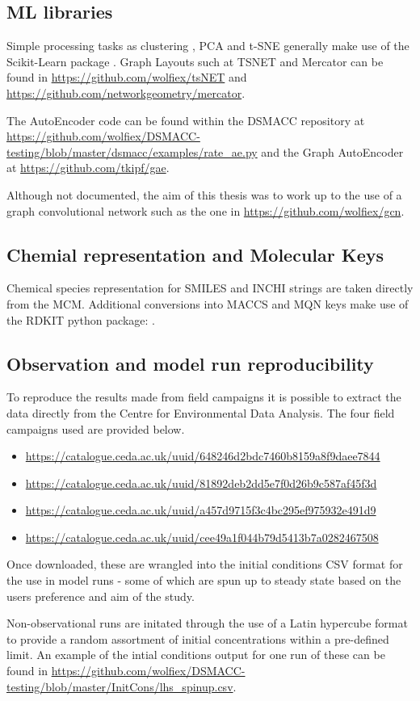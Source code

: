 \subsection*{ML libraries}
Simple processing tasks as clustering , PCA and t-SNE generally make use of the Scikit-Learn package \citep{sklearn}.
Graph Layouts such at TSNET and Mercator can be found in \url{https://github.com/wolfiex/tsNET} and \url{https://github.com/networkgeometry/mercator}.

The AutoEncoder  code can be found within the DSMACC repository at \url{https://github.com/wolfiex/DSMACC-testing/blob/master/dsmacc/examples/rate_ae.py} and the Graph AutoEncoder at \url{https://github.com/tkipf/gae}.


Although not documented, the aim of this thesis was to work up to the use of a graph convolutional network such as the one in \url{https://github.com/wolfiex/gcn}.

\subsection*{Chemial representation and Molecular Keys}
Chemical species representation for SMILES and INCHI strings are taken directly from the MCM. Additional conversions into MACCS and MQN keys make use of the RDKIT  python package: \citep{rdkit}.

\subsection*{Observation and model run reproducibility}
To reproduce the results made from field campaigns it is possible to extract the data directly from the Centre for Environmental Data Analysis. The four field campaigns used are provided below.

\begin{itemize}
 \item{\url{https://catalogue.ceda.ac.uk/uuid/648246d2bdc7460b8159a8f9daee7844}}
 \item {\url{https://catalogue.ceda.ac.uk/uuid/81892deb2dd5e7f0d26b9c587af45f3d}}
 \item{\url{https://catalogue.ceda.ac.uk/uuid/a457d9715f3c4bc295ef975932e491d9}}
 \item {\url{https://catalogue.ceda.ac.uk/uuid/cee49a1f044b79d5413b7a0282467508}}
\end{itemize}

Once downloaded, these are wrangled into the initial conditions CSV format for the use in model runs - some of which are spun up to steady state based on the users preference and aim of the study.

Non-observational runs are initated through the use of a Latin hypercube format to provide a random assortment of initial concentrations within a pre-defined limit. An example of the intial conditions output for one run of these can be found in \url{https://github.com/wolfiex/DSMACC-testing/blob/master/InitCons/lhs_spinup.csv}.




